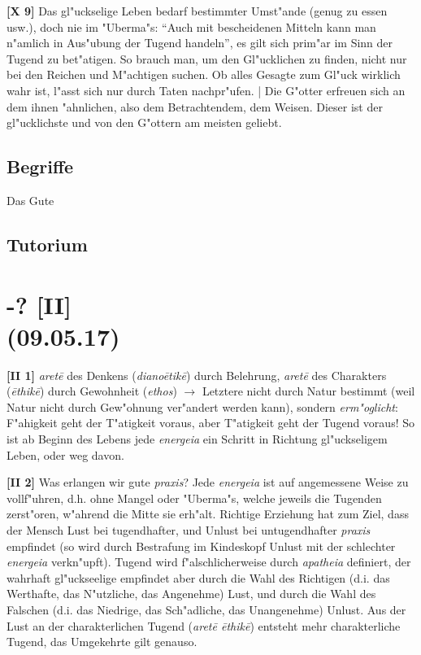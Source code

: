 \documentclass[emulatestandardclasses]{scrartcl}
\begin{document}
\noindent \textbf{[X 9]} Das gl"uckselige Leben bedarf bestimmter Umst"ande (genug zu essen usw.), doch nie im "Uberma"s: "`Auch mit bescheidenen Mitteln kann man n"amlich in Aus"ubung der Tugend handeln"', es gilt sich prim"ar im Sinn der Tugend zu bet"atigen. So brauch man, um den Gl"ucklichen zu finden, nicht nur bei den Reichen und M"achtigen suchen. Ob alles Gesagte zum Gl"uck wirklich wahr ist, l"asst sich nur durch Taten nachpr"ufen. | Die G"otter erfreuen sich an dem ihnen "ahnlichen, also dem Betrachtendem, dem Weisen. Dieser ist der gl"ucklichste und von den G"ottern am meisten geliebt.

\subsection{Begriffe}

\begin{description}[leftmargin=!,labelwidth=\widthof{\bfseries \emph{eudaemonia}}]
  \item[\emph{agathon}] Das Gute
\end{description}

\subsection{Tutorium}


\section{-? [II]\\(09.05.17)}

\textbf{[II 1]} \emph{aret\={e}} des Denkens (\emph{diano\={e}tik\={e}}) durch Belehrung, \emph{aret\={e}} des Charakters (\emph{\={e}thik\={e}}) durch Gewohnheit (\emph{ethos}) $\rightarrow$ Letztere nicht durch Natur bestimmt (weil Natur nicht durch Gew"ohnung ver"andert werden kann), sondern \emph{erm"oglicht}: F"ahigkeit geht der T"atigkeit voraus, aber T"atigkeit geht der Tugend voraus! So ist ab Beginn des Lebens jede \emph{energeia} ein Schritt in Richtung gl"uckseligem Leben, oder weg davon. \newline

\noindent \textbf{[II 2]} Was erlangen wir gute \emph{praxis}? Jede \emph{energeia} ist auf angemessene Weise zu vollf"uhren, d.h. ohne Mangel oder "Uberma"s, welche jeweils die Tugenden zerst"oren, w"ahrend die Mitte sie erh"alt. Richtige Erziehung hat zum Ziel, dass der Mensch Lust bei tugendhafter, und Unlust bei untugendhafter \emph{praxis} empfindet (so wird durch Bestrafung im Kindeskopf Unlust mit der schlechter \emph{energeia} verkn"upft). Tugend wird f"alschlicherweise durch \emph{apatheia} definiert, der wahrhaft gl"uckseelige empfindet aber durch die Wahl des Richtigen (d.i. das Werthafte, das N"utzliche, das Angenehme) Lust, und durch die Wahl des Falschen (d.i. das Niedrige, das Sch"adliche, das Unangenehme) Unlust. Aus der Lust an der charakterlichen Tugend (\emph{aret\={e} \={e}thik\={e}}) entsteht mehr charakterliche Tugend, das Umgekehrte gilt genauso.\newline
\end{document}
